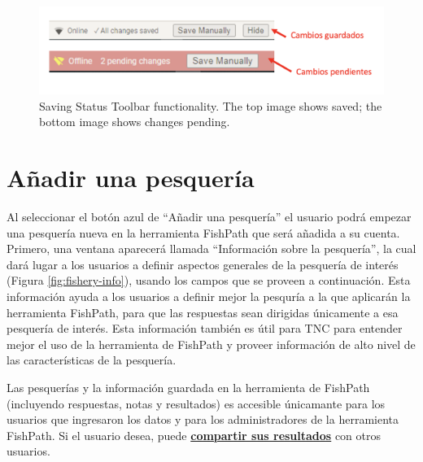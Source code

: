 \documentclass[
  11pt,
]{book}
\begin{document}
\begin{figure}

{\centering \includegraphics[width=0.95\linewidth]{images/saving-status-toolbar-es} 

}

\caption{Saving Status Toolbar functionality. The top image shows saved; the bottom image shows changes pending.}\label{fig:saving-status}
\end{figure}

\hypertarget{auxf1adir-una-pesqueruxeda}{%
\section{Añadir una pesquería}\label{auxf1adir-una-pesqueruxeda}}

Al seleccionar el botón azul de ``Añadir una pesquería'' el usuario podrá empezar una pesquería nueva en la herramienta FishPath que será añadida a su cuenta. Primero, una ventana aparecerá llamada ``Información sobre la pesquería'', la cual dará lugar a los usuarios a definir aspectos generales de la pesquería de interés (Figura \ref{fig:fishery-info}), usando los campos que se proveen a continuación. Esta información ayuda a los usuarios a definir mejor la pesquría a la que aplicarán la herramienta FishPath, para que las respuestas sean dirigidas únicamente a esa pesquería de interés. Esta información también es útil para TNC para entender mejor el uso de la herramienta de FishPath y proveer información de alto nivel de las características de la pesquería.

Las pesquerías y la información guardada en la herramienta de FishPath (incluyendo respuestas, notas y resultados) es accesible únicamante para los usuarios que ingresaron los datos y para los administradores de la herramienta FishPath. Si el usuario desea, puede \protect\hyperlink{Results-Actions}{\textbf{compartir sus resultados}} con otros usuarios.
\end{document}
